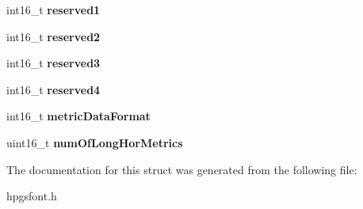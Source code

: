 \begin{DoxyCompactItemize}
\item 
int16\_\-t {\bfseries reserved1}\label{structhpgs__font__hhea__data__st_a02aa7d4cbebc1f11a655d4716dc33cd2}

\item 
int16\_\-t {\bfseries reserved2}\label{structhpgs__font__hhea__data__st_af89ecb526d3e5e26c70e5c41d22a3a48}

\item 
int16\_\-t {\bfseries reserved3}\label{structhpgs__font__hhea__data__st_ac3928392a01e667b6930f923a14e4393}

\item 
int16\_\-t {\bfseries reserved4}\label{structhpgs__font__hhea__data__st_ac7f3dd967328638e299fe16f164da897}

\item 
int16\_\-t {\bfseries metricDataFormat}\label{structhpgs__font__hhea__data__st_ade83ff7dacebe9d05c4e4702ab37ca7b}

\item 
uint16\_\-t {\bfseries numOfLongHorMetrics}\label{structhpgs__font__hhea__data__st_ae411afd8514cd5e25c2d497534c0b246}

\end{DoxyCompactItemize}


The documentation for this struct was generated from the following file:\begin{DoxyCompactItemize}
\item 
hpgsfont.h\end{DoxyCompactItemize}
